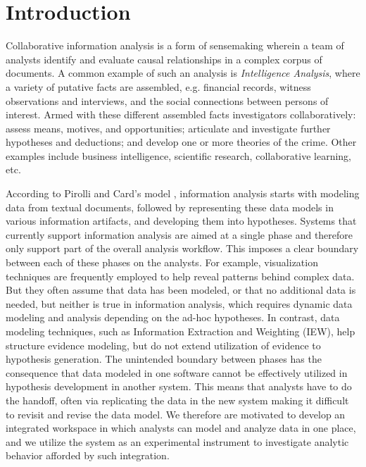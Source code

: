 \section{Introduction}\label{introduction}

Collaborative information analysis is a form of sensemaking wherein a team of analysts
identify and evaluate causal relationships in a complex corpus of documents. A
common example of such an analysis is \emph{Intelligence Analysis}, where a variety of putative facts are assembled, e.g.
financial records, witness observations and interviews, and the social
connections between persons of interest. Armed with these different assembled facts
 investigators collaboratively: assess means, motives,
and opportunities; articulate and investigate further hypotheses and deductions;
and develop one or more theories of the crime. Other examples include business intelligence, scientific research, collaborative learning, etc.


According to Pirolli and Card's model \cite{Pirolli2005}, information analysis
starts with modeling data from textual documents, followed by representing these
data models in various information artifacts, and developing them into
hypotheses.  Systems that currently support information analysis are aimed at a
single phase and therefore only support part of the overall analysis workflow.
This imposes a clear boundary between each of these phases on the analysts. For
example, visualization techniques are frequently employed to help reveal patterns behind complex data. But they often assume
that data has been modeled, or that no additional data is needed, but neither is true in information analysis, which requires dynamic data modeling and analysis depending on the ad-hoc hypotheses. In contrast, data modeling techniques, such as Information Extraction and Weighting (IEW),
help structure evidence modeling, but do not extend utilization of evidence to
hypothesis generation. The unintended boundary between phases has the
consequence that data modeled in one software cannot be effectively utilized in
hypothesis development in another system. This means that analysts have to do the handoff, often
via replicating the data in the new system making it difficult to revisit and revise the data model. We therefore
are motivated to develop an integrated workspace in which analysts can model and
analyze data in one place, and we utilize the system as an experimental
instrument to investigate analytic behavior afforded by such integration.


